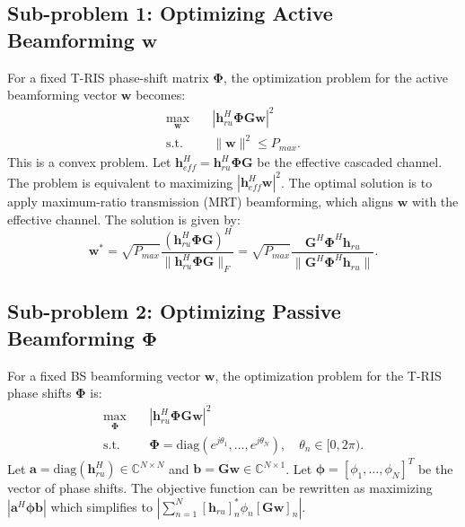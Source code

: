 \documentclass[journal,comsoc]{IEEEtran}
\begin{document}
\subsection{Sub-problem 1: Optimizing Active Beamforming $\mathbf{w}$}
For a fixed T-RIS phase-shift matrix $\boldsymbol{\Phi}$, the optimization problem for the active beamforming vector $\mathbf{w}$ becomes:
\begin{align}
	\max_{\mathbf{w}} \quad & |\mathbf{h}_{ru}^H \boldsymbol{\Phi} \mathbf{G} \mathbf{w}|^2 \\
	\mathrm{s.t.} \quad & \|\mathbf{w}\|^2 \le P_{max}.
\end{align}
This is a convex problem. Let $\mathbf{h}_{eff}^H = \mathbf{h}_{ru}^H \boldsymbol{\Phi} \mathbf{G}$ be the effective cascaded channel. The problem is equivalent to maximizing $|\mathbf{h}_{eff}^H \mathbf{w}|^2$. The optimal solution is to apply maximum-ratio transmission (MRT) beamforming, which aligns $\mathbf{w}$ with the effective channel. The solution is given by:
\begin{equation}
	\mathbf{w}^* = \sqrt{P_{max}} \frac{(\mathbf{h}_{ru}^H \boldsymbol{\Phi} \mathbf{G})^H}{\|\mathbf{h}_{ru}^H \boldsymbol{\Phi} \mathbf{G}\|_F} = \sqrt{P_{max}} \frac{\mathbf{G}^H \boldsymbol{\Phi}^H \mathbf{h}_{ru}}{\|\mathbf{G}^H \boldsymbol{\Phi}^H \mathbf{h}_{ru}\|}.
\end{equation}

\subsection{Sub-problem 2: Optimizing Passive Beamforming $\boldsymbol{\Phi}$}
For a fixed BS beamforming vector $\mathbf{w}$, the optimization problem for the T-RIS phase shifts $\boldsymbol{\Phi}$ is:
\begin{align}
	\max_{\boldsymbol{\Phi}} \quad & |\mathbf{h}_{ru}^H \boldsymbol{\Phi} \mathbf{G} \mathbf{w}|^2 \\
	\mathrm{s.t.} \quad & \boldsymbol{\Phi} = \mathrm{diag}(e^{j\theta_1}, \dots, e^{j\theta_N}), \quad \theta_n \in [0, 2\pi).
\end{align}
Let $\mathbf{a} = \mathrm{diag}(\mathbf{h}_{ru}^H) \in \mathbb{C}^{N \times N}$ and $\mathbf{b} = \mathbf{Gw} \in \mathbb{C}^{N \times 1}$. Let $\boldsymbol{\phi} = [\phi_1, \dots, \phi_N]^T$ be the vector of phase shifts. The objective function can be rewritten as maximizing $|\mathbf{a}^H \boldsymbol{\phi} \mathbf{b}|$ which simplifies to $|\sum_{n=1}^{N} [\mathbf{h}_{ru}]_n^* \phi_n [\mathbf{Gw}]_n|$.
\end{document}
